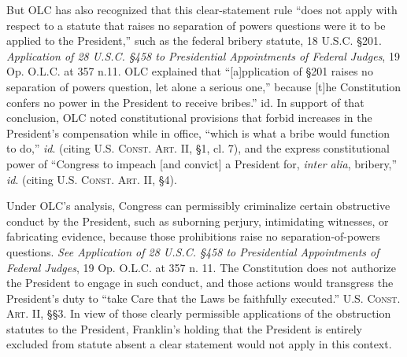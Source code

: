 But OLC has also recognized that this clear-statement rule “does not apply with respect to a statute that raises no separation of powers questions were it to be applied to the President,” such as the federal bribery statute, 18 U.S.C. \S 201.
\textit{Application of 28 U.S.C. \S 458 to Presidential Appointments of Federal Judges}, 19 Op. O.L.C. at 357 n.11. OLC explained that “[a]pplication of \S 201 raises no separation of powers question, let alone a serious one,” because [t]he Constitution confers no power in the President to receive bribes.” id.
In support of that conclusion, OLC noted constitutional provisions that forbid increases in the President’s compensation while in office, “which is what a bribe would function to do,” \textit{id}. (citing \textsc{U.S. Const. Art. II}, \S 1, cl. 7), and the express constitutional power of “Congress to impeach [and convict] a President for, \textit{inter alia}, bribery,” \textit{id}. (citing \textsc{U.S. Const. Art. II}, \S 4).

Under OLC’s analysis, Congress can permissibly criminalize certain obstructive conduct by the President, such as suborning perjury, intimidating witnesses, or fabricating evidence, because those prohibitions raise no separation-of-powers questions.
\textit{See Application of 28 U.S.C. \S 458 to Presidential Appointments of Federal Judges}, 19 Op. O.L.C. at 357 n. 11.
The Constitution does not authorize the President to engage in such conduct, and those actions would transgress the President’s duty to “take Care that the Laws be faithfully executed.”
\textsc{U.S. Const. Art. II}, \S\S 3.
In view of those clearly permissible applications of the obstruction statutes to the President, Franklin’s holding that the President is entirely excluded from statute absent a clear statement would not apply in this context.


